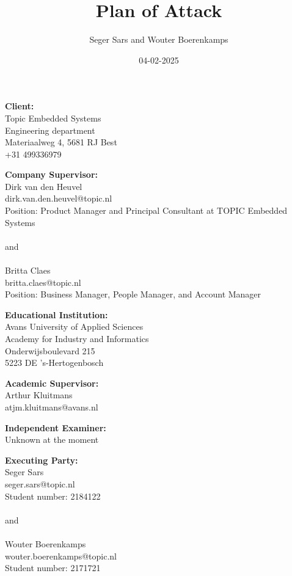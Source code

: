 \documentclass{article}
\title{Plan of Attack}
\author{Seger Sars and Wouter Boerenkamps}
\date{04-02-2025}
\begin{document}
\maketitle

\newpage

\noindent \textbf{Client:}\\
Topic Embedded Systems\\
Engineering department\\
Materiaalweg 4, 5681 RJ Best\\
+31 499336979\\

\vspace{1em}

\noindent \textbf{Company Supervisor:}\\
Dirk van den Heuvel\\
dirk.van.den.heuvel@topic.nl\\
Position: Product Manager and Principal Consultant at TOPIC Embedded Systems\\
\\
and\\
\\
Britta Claes\\
britta.claes@topic.nl\\
Position: Business Manager, People Manager, and Account Manager

\vspace{1em}

\noindent \textbf{Educational Institution:}\\
Avans University of Applied Sciences\\
Academy for Industry and Informatics\\
Onderwijsboulevard 215\\
5223 DE 's-Hertogenbosch

\vspace{1em}

\noindent \textbf{Academic Supervisor:}\\
Arthur Kluitmans\\
atjm.kluitmans@avans.nl

\vspace{1em}

\noindent \textbf{Independent Examiner:}\\
Unknown at the moment

\vspace{1em}

\noindent \textbf{Executing Party:}\\
Seger Sars\\
seger.sars@topic.nl\\
Student number: 2184122\\
\\
and\\
\\
Wouter Boerenkamps\\
wouter.boerenkamps@topic.nl\\
Student number: 2171721
\end{document}
